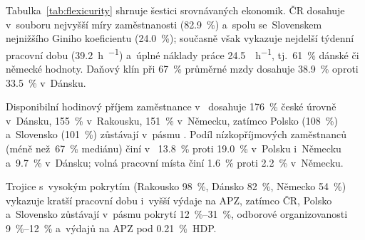 Tabulka~\ref{tab:flexicurity} shrnuje šestici srovnávaných ekonomik. \ac{ČR} dosahuje v~souboru nejvyšší míry zaměstnanosti (\SI{82,9}{\percent}) a~spolu se~Slovenskem nejnižšího Giniho koeficientu (\SI{24,0}{\percent}); současně však vykazuje nejdelší týdenní pracovní dobu (\SI{39,2}{\hour\per\week}) a~úplné náklady práce \SI{24,5}{\pps\per\hour}, tj.~\SI{61}{\percent} dánské či německé hodnoty. Daňový klín  při \SI{67}{\percent} průměrné mzdy dosahuje \SI{38,9}{\percent} oproti \SI{33,5}{\percent} v~Dánsku.

Disponibilní hodinový příjem zaměstnance v~ dosahuje \SI{176}{\percent} české úrovně v~Dánsku, \SI{155}{\percent} v~Rakousku, \SI{151}{\percent} v~Německu, zatímco Polsko (\SI{108}{\percent}) a~Slovensko (\SI{101}{\percent}) zůstávají v~pásmu . Podíl nízkopříjmových zaměstnanců (méně než~\SI{67}{\percent} mediánu) činí v~ \SI{13,8}{\percent} proti \SI{19,0}{\percent} v~Polsku i~Německu a~\SI{9,7}{\percent} v~Dánsku; volná pracovní místa činí \SI{1,6}{\percent} proti \SI{2,2}{\percent} v~Německu.

Trojice s~vysokým pokrytím  (Rakousko \SI{98}{\percent}, Dánsko \SI{82}{\percent}, Německo \SI{54}{\percent}) vykazuje kratší pracovní dobu i~vyšší výdaje na \ac{APZ}, zatímco \ac{ČR}, Polsko a~Slovensko zůstávají v~pásmu pokrytí \SIrange{12}{31}{\percent}, odborové organizovanosti \SIrange{9}{12}{\percent} a~výdajů na \acs{APZ} pod \SI{0,21}{\percent}~\acs{HDP}.


